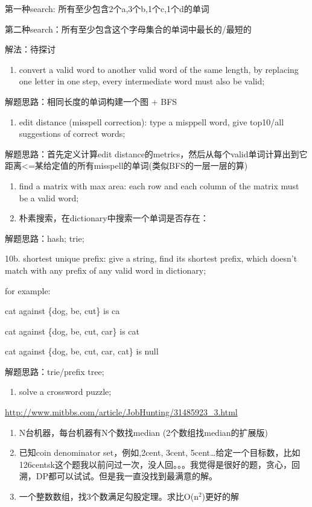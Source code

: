 \documentclass[12pt]{book}
\begin{document}
第一种search: 所有至少包含2个a,3个b,1个c,1个d的单词

第二种search：所有至少包含这个字母集合的单词中最长的/最短的

解法：待探讨

\begin{enumerate}
\item convert a valid word to another valid word of the same length, by replacing one letter in one step, every intermediate word must also be valid;
\end{enumerate}

解题思路：相同长度的单词构建一个图 + BFS

\begin{enumerate}
\item edit distance (misspell correction): type a misppell word, give top10/all suggestions of correct words;
\end{enumerate}

解题思路：首先定义计算edit distance的metrics，然后从每个valid单词计算出到它距离<=某给定值的所有misspell的单词(类似BFS的一层一层的算)

\begin{enumerate}
\item find a matrix with max area: each row and each column of the matrix must be a valid word;

\item 朴素搜索，在dictionary中搜索一个单词是否存在：
\end{enumerate}

解题思路：hash; trie; 

10b. shortest unique prefix: give a string, find its shortest prefix, which doesn't match with any prefix of any valid word in dictionary;

for example:

cat against \{dog, be, cut\} is ca

cat against \{dog, be, cut, car\} is cat

cat against \{dog, be, cut, car, cat\} is null 

解题思路：trie/prefix tree;

\begin{enumerate}
\item solve a crossword puzzle;
\end{enumerate}

\url{http://www.mitbbs.com/article/JobHunting/31485923_3.html}

\begin{enumerate}
\item N台机器，每台机器有N个数找median (2个数组找median的扩展版)

\item 已知coin denominator set，例如,2cent, 3cent, 5cent\ldots{}给定一个目标数，比如126centsk这个题我以前问过一次，没人回。。。我觉得是很好的题，贪心，回溯，DP都可以试试。但是我一直没找到最满意的解。

\item 一个整数数组，找3个数满足勾股定理。求比O(n$^{\text{2}}$)更好的解
\end{enumerate}
\end{document}
